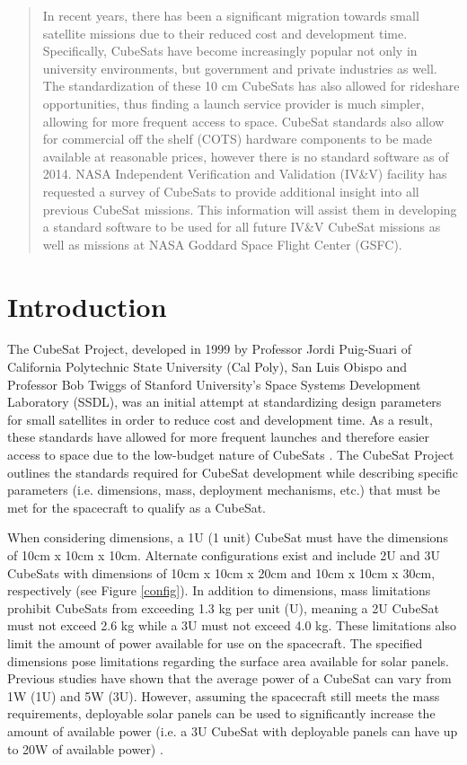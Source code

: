 \documentclass[11pt]{article}
\begin{document}
\maketitle

\begin{abstract}
In recent years, there has been a significant migration towards small satellite missions due to their reduced cost and development time.  Specifically, CubeSats have become increasingly popular not only in university environments, but government and private industries as well.  The standardization of these 10 cm CubeSats has also allowed for rideshare opportunities, thus finding a launch service provider is much simpler, allowing for more frequent access to space.  CubeSat standards also allow for commercial off the shelf (COTS) hardware components to be made available at reasonable prices, however there is no standard software as of 2014.  NASA Independent Verification and Validation (IV\&V) facility has requested a survey of CubeSats to provide additional insight into all previous CubeSat missions.  This information will assist them in developing a standard software to be used for all future IV\&V CubeSat missions as well as missions at NASA Goddard Space Flight Center (GSFC).
\end{abstract}

\section{Introduction}
The CubeSat Project, developed in 1999 by Professor Jordi Puig-Suari of California Polytechnic State University (Cal Poly), San Luis Obispo and Professor Bob Twiggs of Stanford University's Space Systems Development Laboratory (SSDL), was an initial attempt at standardizing design parameters for small satellites in order to reduce cost and development time.  As a result, these standards have allowed for more frequent launches and therefore easier access to space due to the low-budget nature of CubeSats \cite{CalPoly}.  The CubeSat Project outlines the standards required for CubeSat development while describing specific parameters (i.e. dimensions, mass, deployment mechanisms, etc.) that must be met for the spacecraft to qualify as a CubeSat.

When considering dimensions, a 1U (1 unit) CubeSat must have the dimensions of 10cm x 10cm x 10cm.  Alternate configurations exist and include 2U and 3U CubeSats with dimensions of 10cm x 10cm x 20cm and 10cm x 10cm x 30cm, respectively (see Figure \ref{config}).  In addition to dimensions, mass limitations prohibit CubeSats from exceeding 1.3 kg per unit (U), meaning a 2U CubeSat must not exceed 2.6 kg while a 3U must not exceed 4.0 kg.  These limitations also limit the amount of power available for use on the spacecraft.  The specified dimensions pose limitations regarding the surface area available for solar panels.  Previous studies have shown that the average power of a CubeSat can vary from 1W (1U) and 5W (3U).  However, assuming the spacecraft still meets the mass requirements, deployable solar panels can be used to significantly increase the amount of available power (i.e. a 3U CubeSat with deployable panels can have up to 20W of available power) \cite{ClydeSpace}. 
\end{document}
